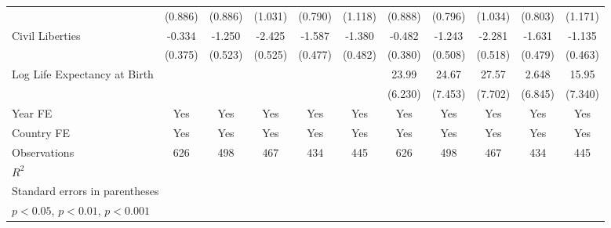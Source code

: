 \begin{table}[htbp]
\begin{tabular}{l*{10}{c}}
                &  (0.886)         &  (0.886)         &  (1.031)         &  (0.790)         &  (1.118)         &  (0.888)         &  (0.796)         &  (1.034)         &  (0.803)         &  (1.171)         \\
\addlinespace
Civil Liberties &   -0.334         &   -1.250\sym{*}  &   -2.425\sym{***}&   -1.587\sym{***}&   -1.380\sym{**} &   -0.482         &   -1.243\sym{*}  &   -2.281\sym{***}&   -1.631\sym{***}&   -1.135\sym{*}  \\
                &  (0.375)         &  (0.523)         &  (0.525)         &  (0.477)         &  (0.482)         &  (0.380)         &  (0.508)         &  (0.518)         &  (0.479)         &  (0.463)         \\
\addlinespace
Log Life Expectancy at Birth&                  &                  &                  &                  &                  &    23.99\sym{***}&    24.67\sym{***}&    27.57\sym{***}&    2.648         &    15.95\sym{*}  \\
                &                  &                  &                  &                  &                  &  (6.230)         &  (7.453)         &  (7.702)         &  (6.845)         &  (7.340)         \\
\addlinespace
Year FE         &      Yes         &      Yes         &      Yes         &      Yes         &      Yes         &      Yes         &      Yes         &      Yes         &      Yes         &      Yes         \\
\addlinespace
Country FE      &      Yes         &      Yes         &      Yes         &      Yes         &      Yes         &      Yes         &      Yes         &      Yes         &      Yes         &      Yes         \\
\midrule
Observations    &      626         &      498         &      467         &      434         &      445         &      626         &      498         &      467         &      434         &      445         \\
\(R^{2}\)       &                  &                  &                  &                  &                  &                  &                  &                  &                  &                  \\
\bottomrule
\multicolumn{11}{l}{\footnotesize Standard errors in parentheses}\\
\multicolumn{11}{l}{\footnotesize \sym{*} \(p<0.05\), \sym{**} \(p<0.01\), \sym{***} \(p<0.001\)}\\
\end{tabular}
\end{table}
